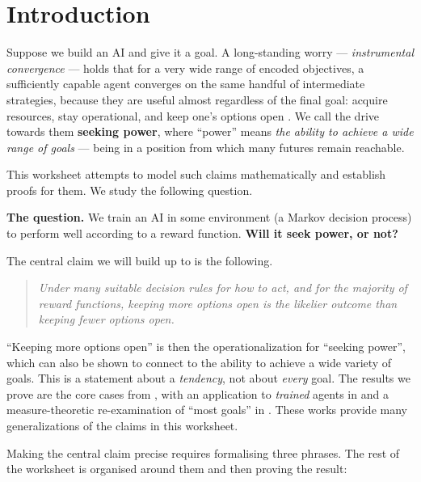 \documentclass[11pt]{article}
\begin{document}
\section*{Introduction}


Suppose we build an AI and give it a goal.
A long-standing worry --- \emph{instrumental convergence} --- holds that for a very wide
range of encoded objectives, a sufficiently capable agent converges on the same handful
of intermediate strategies, because they are useful almost regardless of the final goal:
acquire resources, stay operational, and keep one's options open
\cite{omohundro2008basic,bostrom2014superintelligence}. We call the drive towards
them \textbf{seeking power}, where ``power'' means \emph{the ability to achieve a wide
range of goals} --- being in a position from which many futures remain reachable.

This worksheet attempts to model such claims mathematically and establish proofs for them. We study the following question.

\begin{callout}
\textbf{The question.}
We train an AI in some environment (a Markov decision process) to perform well according
to a reward function. \textbf{Will it seek power, or not?}
\end{callout}

The central claim we will
build up to is the following.

\begin{quote}
\emph{Under many suitable decision rules for how to act, and for the majority of reward
functions, keeping more options open is the likelier outcome than keeping fewer options
open.}
\end{quote}

``Keeping more options open'' is then the operationalization for ``seeking power'', which can also be shown to connect to the ability to achieve a wide variety of goals.
This is a statement about a \emph{tendency}, not about \emph{every} goal. The results we prove are the core cases from
\cite{turner2021optimal,turner2022parametrically}, with an application to
\emph{trained} agents in \cite{krakovna2023power} and a measure-theoretic re-examination
of ``most goals'' in \cite{jacek2023categorical}. These works provide many generalizations of the claims in this worksheet.

Making the central claim precise requires formalising three phrases. The rest of the
worksheet is organised around them and then proving the result:
\end{document}

